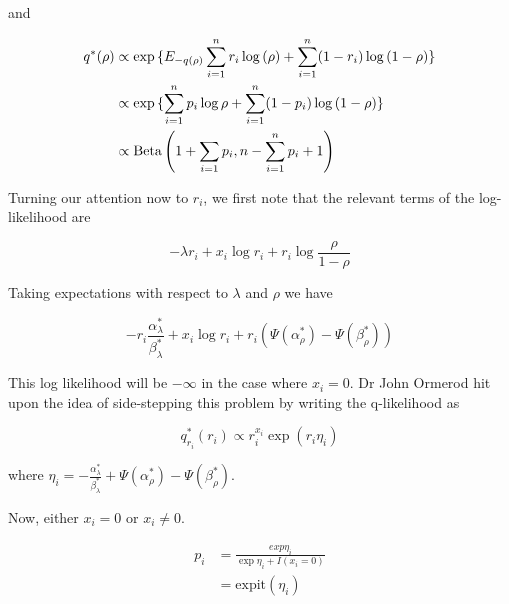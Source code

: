 \documentclass{amsart}
\begin{document}
and

\begin{align*}
q^*(\rho) &\propto \exp{\{ E_{-q(\rho)} \sum_{i=1}^n r_i \log{(\rho)} + \sum_{i=1}^n (1- r_i) \log{(1 - \rho)} \}} \\
&\propto \exp{\{ \sum_{i=1}^n p_i \log{\rho} + \sum_{i=1}^n (1 - p_i) \log{(1 - \rho)} \}} \\
&\propto \text{Beta} \left( 1+ \sum_{i=1} p_i, n - \sum_{i=1}^n p_i + 1 \right)
\end{align*}

Turning our attention now to $r_i$, we first note that the relevant terms of the
log-likelihood are

$$
-\lambda r_i + x_i \log{r_i} + r_i \log{\frac{\rho}{1 - \rho}}
$$

Taking expectations with respect to $\lambda$ and $\rho$ we have

$$
-r_i \frac{\alpha_\lambda^*}{\beta_\lambda^*} + x_i \log{r_i} + r_i (\Psi(\alpha_\rho^*) - \Psi(\beta_\rho^*))
$$

This log likelihood will be $-\infty$ in the case where $x_i = 0$. Dr John Ormerod hit
upon the idea of side-stepping this problem by writing the q-likelihood as

$$
q_{r_i}^*(r_i) \propto r_i^{x_i} \exp{(r_i \eta_i)}
$$

where $\eta_i = - \frac{\alpha_\lambda^*}{\beta_\lambda^*} + \Psi(\alpha_\rho^*) - \Psi(\beta_\rho^*)$.

Now, either $x_i = 0$ or $x_i \ne 0$.

\begin{align*}
p_i &= \frac{exp{\eta_i}}{\exp{\eta_i} + I(x_i = 0)} \\
&= \text{expit}(\eta_i)
\end{align*}
\end{document}
